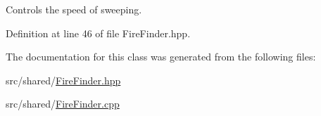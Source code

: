 Controls the speed of sweeping. 



Definition at line 46 of file Fire\-Finder.\-hpp.



The documentation for this class was generated from the following files\-:\begin{DoxyCompactItemize}
\item 
src/shared/\hyperlink{FireFinder_8hpp}{Fire\-Finder.\-hpp}\item 
src/shared/\hyperlink{FireFinder_8cpp}{Fire\-Finder.\-cpp}\end{DoxyCompactItemize}
